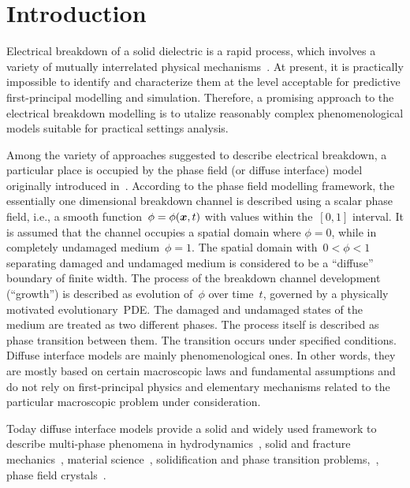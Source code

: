 
\section{Introduction}

Electrical breakdown of a solid dielectric is a rapid process, which
involves a variety of mutually interrelated physical
mechanisms~\cite{vorobiev_dielectric_physics, dissado_1992}. At present, it is
practically impossible to identify and characterize them at the level acceptable
for predictive first-principal modelling and simulation. Therefore, a promising
approach to the electrical breakdown modelling is to utalize reasonably complex
phenomenological models suitable for practical settings analysis.

Among the variety of approaches suggested to describe electrical breakdown,
a particular place is occupied by the phase field (or diffuse interface) model
originally introduced in~\cite{pitike_dielectric_breakdown}.
According to the phase field modelling framework, the essentially one dimensional
breakdown channel is described using a scalar phase field, i.e., a smooth
function~$\phi = \phi(\boldsymbol{x},t)$ with values within the~$[0, 1]$
interval. It is assumed that the channel occupies
a spatial domain where $\phi = 0$, while in completely undamaged medium~$\phi = 1$. The
spatial domain with~$0 < \phi < 1$ separating damaged and undamaged medium
is considered to be a ``diffuse'' boundary of finite width. The process of the breakdown
channel development (``growth'') is described as evolution of~$\phi$ over time~$t$, governed by
a physically motivated evolutionary~PDE. The damaged and undamaged states of the
medium are treated as two different phases. The process itself is described as phase
transition between them. The transition occurs under specified conditions.
Diffuse interface models are mainly phenomenological ones. In other
words, they are mostly based on certain macroscopic laws and
fundamental assumptions and do not rely on first-principal
physics and elementary mechanisms related to the
particular macroscopic problem under consideration.

Today diffuse interface models provide a solid and widely used
framework to describe multi-phase phenomena in
hydrodynamics~\cite{lamorgese_flow_modeling, kim_fluid_flows, xu_hydrodynamics},
solid and fracture mechanics~\cite{ambati_fracture},
material science~\cite{provatas_materials}, solidification and phase
transition problems,~\cite{boettinger_solidification,
  cartalade_phase_separation, gransaly_solidification},
phase field crystals~\cite{emmerich_crystal, asadi_crystal,
  provatas_crystal}.

